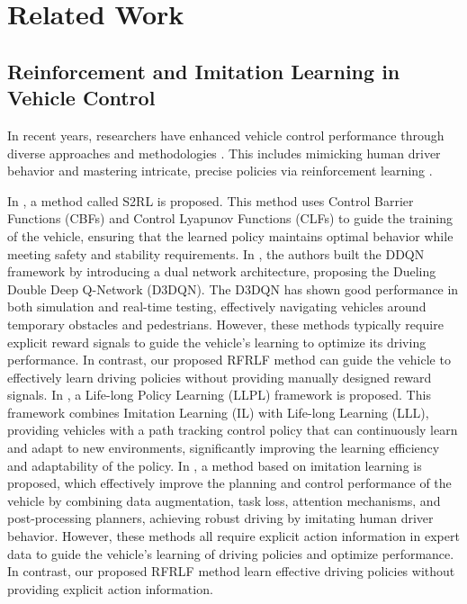 \section{Related Work}
\label{2}
\subsection{Reinforcement and Imitation Learning in Vehicle Control}
In recent years, researchers have enhanced vehicle control performance through diverse approaches and methodologies \cite{kiran2021deep,li2024iss}. This includes mimicking human driver behavior \cite{sun2023benchmark,gao2019comparison} and mastering intricate, precise policies via reinforcement learning \cite{patel2024enhancing,chen2023risk}.

In \cite{gangopadhyay2022safe}, a method called S2RL is proposed. This method uses Control Barrier Functions (CBFs) and Control Lyapunov Functions (CLFs) to guide the training of the vehicle, ensuring that the learned policy maintains optimal behavior while meeting safety and stability requirements. In \cite{manikandan2023ad}, the authors built the DDQN framework by introducing a dual network architecture, proposing the Dueling Double Deep Q-Network (D3DQN). The D3DQN has shown good performance in both simulation and real-time testing, effectively navigating vehicles around temporary obstacles and pedestrians. However, these methods typically require explicit reward signals to guide the vehicle's learning to optimize its driving performance. In contrast, our proposed RFRLF method can guide the vehicle to effectively learn driving policies without providing manually designed reward signals. In \cite{gong2024beyond}, a Life-long Policy Learning (LLPL) framework is proposed. This framework combines Imitation Learning (IL) with Life-long Learning (LLL), providing vehicles with a path tracking control policy that can continuously learn and adapt to new environments, significantly improving the learning efficiency and adaptability of the policy. In \cite{zhou2021exploring}, a method based on imitation learning is proposed, which effectively improve the planning and control performance of the vehicle by combining data augmentation, task loss, attention mechanisms, and post-processing planners, achieving robust driving by imitating human driver behavior. However, these methods all require explicit action information in expert data to guide the vehicle's learning of driving policies and optimize performance. In contrast, our proposed RFRLF method learn effective driving policies without providing explicit action information.

